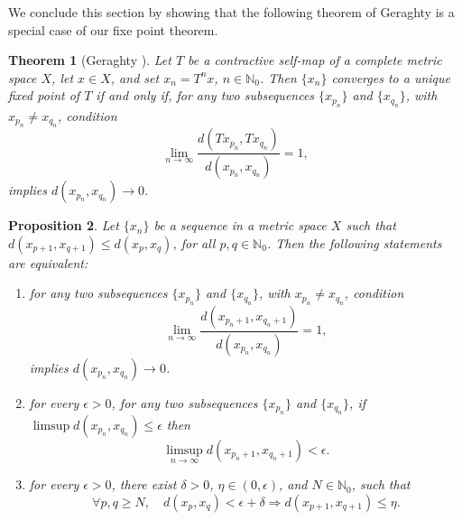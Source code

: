 \documentclass[a4paper,10pt,twoside,reqno]{amsart}
\newtheorem{thm}{Theorem}[section]
\newtheorem{prop}[thm]{Proposition}
\theoremstyle{definition}
\theoremstyle{remark}
\newcommand{\set}[1]{\{#1\}}
\newcommand{\de}{\delta}
\newcommand{\e}{\epsilon}
\newcommand{\N}{\mathbb{N}}
\numberwithin{equation}{section}
\begin{document}
We conclude this section by showing that the following theorem of
Geraghty \cite{Geraghty-73} is a special case of our fixe point theorem.

\begin{thm}[Geraghty \cite{Geraghty-73}]
\label{thm:Geraghty}
  Let $T$ be a contractive self-map of a complete metric space $X$,
  let $x\in X$, and set $x_n=T^n x$, $n\in\N_0$. Then $\set{x_n}$
  converges to a unique fixed point of $T$ if and only if,
  for any two subsequences $\set{x_{p_n}}$ and $\set{x_{q_n}}$, with
  $x_{p_n}\neq x_{q_n}$, condition
  \begin{equation*}
    \lim_{n\to\infty}\frac{d(Tx_{p_n},Tx_{q_n})}{d(x_{p_n},x_{q_n})}=1,
  \end{equation*}
  implies $d(x_{p_n},x_{q_n})\to0$.
\end{thm}

\begin{prop}
\label{prop:G-contractive-property-is-a-general-one}
  Let $\set{x_n}$ be a sequence in a metric space $X$ such that
  $d(x_{p+1},x_{q+1}) \leq d(x_p,x_q)$, for all $p,q\in \N_0$.
  Then the following statements are equivalent:
  \begin{enumerate}[\upshape(i)]
    \item \label{item:it-is-a-Geraghty-sequence}
    for any two subsequences $\set{x_{p_n}}$ and $\set{x_{q_n}}$, with
    $x_{p_n}\neq x_{q_n}$, condition
    \begin{equation}\label{eqn:lim=1-in-Geraghty-equiv}
      \lim_{n\to\infty}\frac{d(x_{p_n+1},x_{q_n+1})}{d(x_{p_n},x_{q_n})}=1,
    \end{equation}
    implies $d(x_{p_n},x_{q_n})\to0$.

    \item \label{item:Geraghty-sequence-in-term-of-pnqn}
    for every $\e>0$, for any two subsequences $\{x_{p_n}\}$ and $\{x_{q_n}\}$,
    if\newline  $\limsup d(x_{p_n},x_{q_n})\leq \e$ then
    \begin{equation}\label{eqn:Geraghty-sequence-in-term-of-pnqn}
      \limsup_{n\to\infty}d(x_{p_n+1},x_{q_n+1}) < \e.
    \end{equation}

    \item \label{item:Geraghty-sequence-in-e-de-eta}
    for every $\e>0$, there exist $\de>0$, $\eta\in(0,\e)$, and $N\in\N_0$, such that
    \begin{equation}\label{eqn:Geraghty-sequence-in-e-de-eta}
      \forall p,q \geq N,\quad
      d(x_p,x_q) < \e + \de \Longrightarrow
      d(x_{p+1},x_{q+1}) \leq \eta.
    \end{equation}
  \end{enumerate}
\end{prop}
\end{document}
